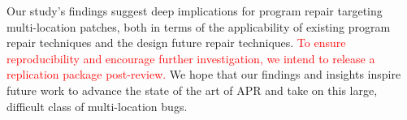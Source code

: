 \documentclass[10pt, conference]{IEEEtran}
\newcommand\todo[1]{\textcolor{red}{#1}}
\begin{document}
Our study's findings suggest deep implications for program repair targeting
multi-location patches, both in terms of the applicability of existing program
repair techniques and the design future repair techniques. \todo{To ensure
reproducibility and encourage further investigation, we intend to release a
replication package post-review.}
We hope that our findings and insights inspire future work to advance 
the state of the art of APR and take on this large, difficult class of 
multi-location bugs.



\end{document}
